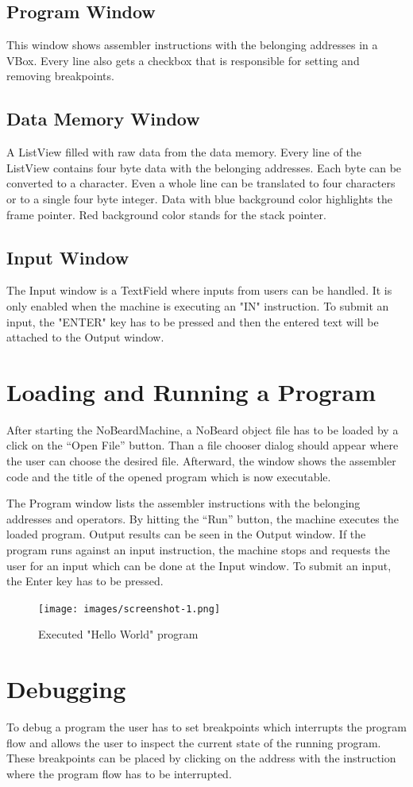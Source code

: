 \subsection{Program Window}
This window shows assembler instructions with the belonging addresses in a VBox. Every line also gets a checkbox that is responsible for setting and removing breakpoints.
\subsection{Data Memory Window}
A ListView filled with raw data from the data memory. Every line of the ListView contains four byte data with the belonging addresses. Each byte can be converted to a character. Even a whole line can be translated to four characters or to a single four byte integer. Data with blue background color highlights the frame pointer. Red background color stands for the stack pointer.
\subsection{Input Window}
The Input window is a TextField where inputs from users can be handled. It is only enabled when the machine is executing an "IN" instruction. To submit an input, the "ENTER" key has to be pressed and then the entered text will be attached to the Output window.
\section{Loading and Running a Program}
After starting the NoBeardMachine, a NoBeard object file has to be loaded by a click on the “Open File” button. Than a file chooser dialog should appear where the user can choose the desired file. Afterward, the window shows the assembler code and the title of the opened program which is now executable.

The Program window lists the assembler instructions with the belonging addresses and operators. By hitting the “Run” button, the machine executes the loaded program. Output results can be seen in the Output window. If the program runs against an input instruction, the machine stops and requests the user for an input which can be done at the Input window. To submit an input, the Enter key has to be pressed.
\begin{figure}[h] 
	\centering
	\texttt{[image: images/screenshot-1.png]}
	\caption{Executed "Hello World" program}
\end{figure}

\section{Debugging}
To debug a program the user has to set breakpoints which interrupts the program flow and allows the user to inspect the current state of the running program. These breakpoints can be placed by clicking on the address with the instruction where the program flow has to be interrupted. 

